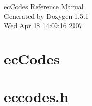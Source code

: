 \documentclass[a4paper]{book}
\begin{document}
\begin{titlepage}
\vspace*{7cm}
\begin{center}
{\Large ecCodes Reference Manual}\\
\vspace*{1cm}
{\large Generated by Doxygen 1.5.1}\\
\vspace*{0.5cm}
{\small Wed Apr 18 14:09:16 2007}\\
\end{center}
\end{titlepage}
\clearemptydoublepage
{}
\tableofcontents
\clearemptydoublepage
{}
\chapter{ecCodes}
\label{index}\hypertarget{index}{}


%








%
%
%
%
%
%
%
%
%
%
%
%
%
%
%
%
%
%
%
%
%
%
%
\chapter{eccodes.h}

\printindex
\end{document}
